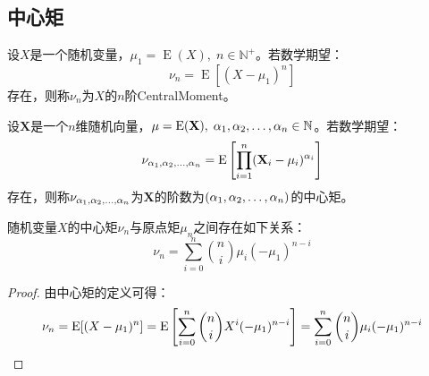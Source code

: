 \subsection{中心矩}
\begin{definition}
	设$X$是一个随机变量，$\mu_1=\operatorname{E}(X),\;n\in\mathbb{N}^+$。若数学期望：
	\begin{equation*}
		\nu_n=\operatorname{E}[(X-\mu_1)^n]
	\end{equation*}
	存在，则称$\nu_n$为$X$的$n$阶\gls{CentralMoment}。
\end{definition}
\begin{definition}
设$\mathbf{X}$是一个$n$维随机向量，$\mu=\operatorname{E}(\mathbf{X}),\;\alpha_1, \alpha_2, \dots, \alpha_{n}\in\mathbb{N}$。若数学期望：
\begin{equation*}
	\nu_{\alpha_1, \alpha_2, \dots, \alpha_{n}}=\operatorname{E}\left[\prod_{i=1}^{n}(\mathbf{X}_i-\mu_i)^{\alpha_i}\right]
\end{equation*}
存在，则称$\nu_{\alpha_1, \alpha_2, \dots, \alpha_{n}}$为$\mathbf{X}$的阶数为$(\alpha_1, \alpha_2, \dots, \alpha_{n})$的中心矩。
\end{definition}
\begin{theorem}\label{theo:Moment}
	随机变量$X$的中心矩$\nu_n$与原点矩$\mu_n$之间存在如下关系：
	\begin{equation*}
		\nu_n=\sum_{i=0}^{n}\binom{n}{i}\mu_i(-\mu_1)^{n-i}
	\end{equation*}
\end{theorem}
\begin{proof}
	由中心矩的定义可得：
	\begin{equation*}
		\nu_n
		=\operatorname{E}[(X-\mu_1)^n]
		=\operatorname{E}\left[\sum_{i=0}^{n}\binom{n}{i}X^i(-\mu_1)^{n-i}\right]
		=\sum_{i=0}^{n}\binom{n}{i}\mu_i(-\mu_1)^{n-i}\qedhere
	\end{equation*}
\end{proof}